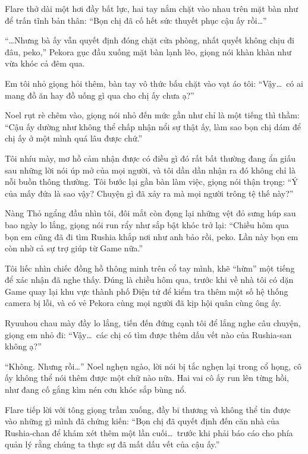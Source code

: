 \documentclass[../main.tex]{subfiles}
\begin{document}
Flare thở dài một hơi đầy bất lực, hai tay nắm chặt vào nhau trên mặt bàn như để trấn tĩnh bản thân: ``Bọn chị đã cố hết sức thuyết phục cậu ấy rồi\dots''

``\dots Nhưng bà ấy vẫn quyết định đóng chặt cửa phòng, nhất quyết không chịu đi đâu, peko,'' Pekora gục đầu xuống mặt bàn lạnh lẽo, giọng nói khàn khàn như vừa khóc cả đêm qua.

Em tôi nhỏ giọng hỏi thêm, bàn tay vô thức bấu chặt vào vạt áo tôi: ``Vậy\dots\ có ai mang đồ ăn hay đồ uống gì qua cho chị ấy chưa ạ?''

Noel rụt rè chêm vào, giọng nói nhỏ đến mức gần như chỉ là một tiếng thì thầm: ``Cậu ấy dường như không thể chấp nhận nổi sự thật ấy, làm sao bọn chị dám để chị ấy ở một mình quá lâu được chứ.''

Tôi nhíu mày, mơ hồ cảm nhận được có điều gì đó rất bất thường đang ẩn giấu sau những lời nói úp mở của mọi người, và tôi dần dần nhận ra đó không chỉ là nỗi buồn thông thường. Tôi bước lại gần bàn làm việc, giọng nói thận trọng: ``Ý của mấy đứa là sao vậy? Chuyện gì đã xảy ra mà mọi người trông tệ thế này?''

Nàng Thỏ ngẩng đầu nhìn tôi, đôi mắt còn đọng lại những vệt đỏ sưng húp sau bao ngày lo lắng, giọng nói run rẩy như sắp bật khóc trở lại: ``Chiều hôm qua bọn em cũng đã đi tìm Rushia khắp nơi như anh bảo rồi, peko. Lần này bọn em còn nhờ cả sự trợ giúp từ Game nữa.''

Tôi liếc nhìn chiếc đồng hồ thông minh trên cổ tay mình, khẽ ``hừm'' một tiếng để xác nhận đã nghe thấy. Đúng là chiều hôm qua, trước khi về nhà tôi có dặn Game quay lại khu vực thành phố Điện tử để kiểm tra thêm một số hệ thống camera bị lỗi, và có vẻ Pekora cùng mọi người đã kịp hội quân cùng ông ấy.

Ryuuhou chau mày đầy lo lắng, tiến đến đứng cạnh tôi để lắng nghe câu chuyện, giọng em nhỏ đi: ``Vậy\dots\ các chị có tìm được thêm dấu vết nào của Rushia-san không ạ?''

``Không. Nhưng rồi\dots'' Noel nghẹn ngào, lời nói bị tắc nghẹn lại trong cổ họng, cô ấy không thể nói thêm được một chữ nào nữa. Hai vai cô ấy run lên từng hồi, như đang cố gắng kìm nén cơn khóc sắp bùng nổ.

Flare tiếp lời với tông giọng trầm xuống, đầy bi thương và không thể tin được vào những gì mình đã chứng kiến: ``Bọn chị đã quyết định đến căn nhà của Rushia-chan để khám xét thêm một lần cuối\dots\ trước khi phải báo cáo cho phía quản lý rằng chúng ta thực sự đã mất dấu vết của cậu ấy.''
\end{document}
